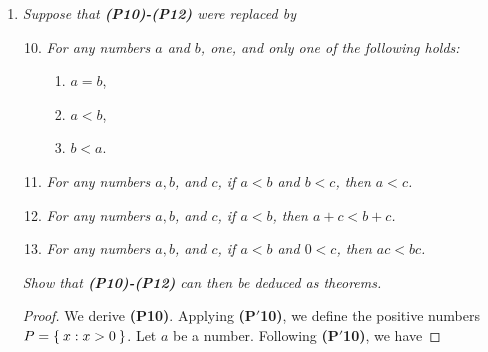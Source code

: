 \documentclass[12pt]{amsbook}
\theoremstyle{plain}
\numberwithin{section}{chapter}
\numberwithin{equation}{chapter}
\theoremstyle{definition}
\theoremstyle{remark}
\newtheorem{rem}[theorem]{Remark}
\theoremstyle{plain}
\newcommand{\bb}{\vspace{3mm}}
\newcommand{\bee}{\begin{equation}\begin{aligned}}
\newcommand{\eee}{\end{aligned}\end{equation}}
\begin{document}
\begin{enumerate}[label=\roman*)]
\begin{enumerate}[label=(\roman*)]
\bb
\setcounter{enumii}{5}
\item \textit{If $a > 1$, then $a^2 > a$. }
\begin{proof}
Since $1 < a$, we know $a - 1 \in P$. Note that $0 < 1$ and $1 < a$ give us $0 < a$ by the following:
\begin{rem}
\textbf{Transitivity:} If $x < y$ and $y < z$, then $x < z$. 
\end{rem}
\begin{proof}
Let $x <y$ and $y < z$. Then we know $y - x \in P$ and $z - y \in P$. We want to know if $z - x \in P$. But by \textbf{(P11)}, we know 
\bee
y - x + z - y = z - x \in P.
\eee
Thus $x < z$. 
\end{proof}
And since $0 < a \Rightarrow a - 0 = a \in P$ by \textbf{(P2)}, $a \in P$. Then we have
\bee
a \in P,a - 1 \in P \Rightarrow a(a - 1) \in P && \text{by \textbf{(P12)}}\\
a(a - 1) = a^2 - a && \text{by \textbf{(P9)}}\\
a^2 - a = a(a - 1) \in P \Rightarrow a < a^2 && \text{by definition.}
\eee
Alternatively, upon proving that $a > 0$ you could simply apply part (iv), noting that $1 < a$, $a > 0 \Rightarrow a < a^2$ by \textbf{(P6)}. 
\end{proof}
\end{enumerate}
\setcounter{enumi}{7}
\item \textit{Suppose that \textbf{(P10)-(P12)} were replaced by}
\begin{enumerate}[label=\textbf{(P$'$\arabic*)}]
\setcounter{enumii}{9}
\item \textit{For any numbers $a$ and $b$, one, and only one of the following holds:}
\begin{enumerate}
\item $a = b$,
\item $a < b$,
\item $b < a$. 
\end{enumerate}
\item \textit{For any numbers $a,b$, and $c$, if $a < b$ and $b < c$, then $a < c$. }
\item \textit{For any numbers $a,b$, and $c$, if $a < b$, then $a + c < b + c$. }
\item \textit{For any numbers $a,b$, and $c$, if $a < b$ and $0 < c$, then $ac < bc$. }
\end{enumerate}
\textit{Show that \textbf{(P10)-(P12)} can then be deduced as theorems. }

\begin{proof}
We derive \textbf{(P10)}. Applying \textbf{(P$'$10)}, we define the positive numbers $P = \Set{x: x > 0}$. Let $a$ be a number. Following \textbf{(P$'$10)}, we have


\end{proof}
\end{enumerate}
\end{document}

